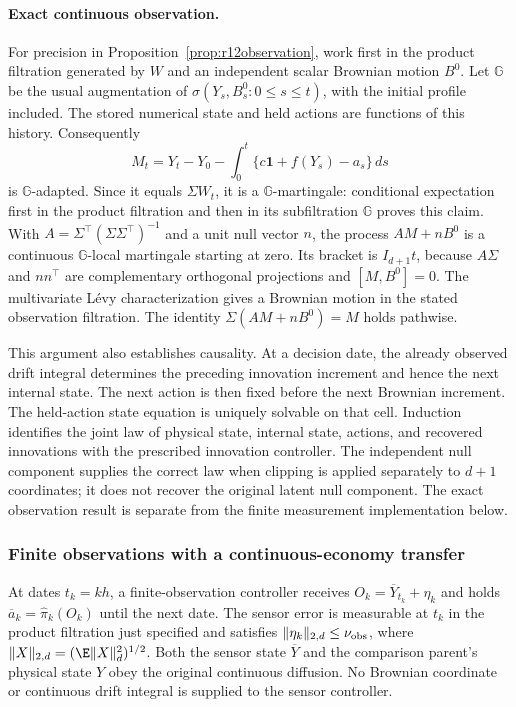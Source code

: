 \paragraph*{Exact continuous observation.}
For precision in Proposition~\ref{prop:r12observation}, work first in
the product filtration generated by $W$ and an independent scalar
Brownian motion $B^0$. Let $\mathbb G$ be the usual augmentation of
$\sigma(Y_s,B_s^0:0\leq s\leq t)$, with the initial profile included.
The stored numerical state and held actions are functions of this
history. Consequently
\[
 M_t=Y_t-Y_0-\int_0^t\{c\bm1+f(Y_s)-a_s\}\,ds
\]
is $\mathbb G$-adapted. Since it equals $\Sigma W_t$, it is a
$\mathbb G$-martingale: conditional expectation first in the product
filtration and then in its subfiltration $\mathbb G$ proves this claim.
With $A=\Sigma^\top(\Sigma\Sigma^\top)^{-1}$ and a unit null vector
$n$, the process $AM+nB^0$ is a continuous $\mathbb G$-local martingale
starting at zero. Its bracket is $I_{d+1}t$, because
$A\Sigma$ and $nn^\top$ are complementary orthogonal projections and
$[M,B^0]=0$. The multivariate L\'evy characterization gives a Brownian
motion in the stated observation filtration. The identity
$\Sigma(AM+nB^0)=M$ holds pathwise.

This argument also establishes causality. At a decision date, the
already observed drift integral determines the preceding innovation
increment and hence the next internal state. The next action is then
fixed before the next Brownian increment. The held-action state equation
is uniquely solvable on that cell. Induction identifies the joint law
of physical state, internal state, actions, and recovered innovations
with the prescribed innovation controller. The independent null
component supplies the correct law when clipping is applied separately
to $d+1$ coordinates; it does not recover the original latent null
component. The exact observation result is separate from the finite
measurement implementation below.



\subsubsection{Finite observations with a continuous-economy transfer}
\label{sec:r14sensing}
At dates $t_k=kh$, a finite-observation controller receives
$O_k=\overline Y_{t_k}+\eta_k$ and holds
$\overline a_k=\widehat\pi_k(O_k)$ until the next date. The sensor
error is measurable at $t_k$ in the product filtration just specified
and satisfies $\|\eta_k\|_{2,d}\leq\nu_{\rm obs}$, where
$\|X\|_{2,d}=(\E\|X\|_d^2)^{1/2}$. Both the sensor state
$\overline Y$ and the comparison parent's physical state $Y$ obey the
original continuous diffusion. No Brownian coordinate or continuous
drift integral is supplied to the sensor controller.

